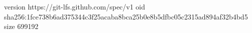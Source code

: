 version https://git-lfs.github.com/spec/v1
oid sha256:1fce738b6ad375344c3f25acaba8bca25b0e8b5dfbc05c2315ad894af32b4bd5
size 699192
